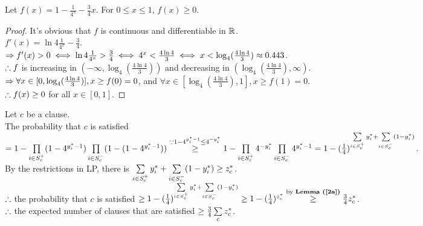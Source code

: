 \begin{pr}
\begin{lm}
\label{2a}
Let $f(x)=1-\frac1{4^x}-\frac34x$. For $0\leq x\leq1$, $f(x)\geq0$.
\begin{proof}
It's obvious that $f$ is continuous and differentiable in $\mathbb{R}$.\\
$f'(x)=\ln4\frac1{4^x}-\frac34$.\\
$\Rightarrow f'(x)>0\iff\ln4\frac1{4^x}>\frac34\iff4^x<\frac{4\ln4}3\iff x<\log_4(\frac{4\ln4}3)\approx0.443$.\\
$\therefore f$ is increasing in $(-\infty, \log_4(\frac{4\ln4}3))$ and decreasing in $(\log_4(\frac{4\ln4}3), \infty)$.\\
$\Rightarrow\forall x\in[0, \log_4(\frac{4\ln4}3)], x\geq f(0)=0$, and $\forall x\in[\log_4(\frac{4\ln4}3), 1], x\geq f(1)=0$.\\
$\therefore f(x)\geq0$ for all $x\in[0, 1]$.
\end{proof}
\end{lm}
\newcommand{\scp}{{S_c^+}}
\newcommand{\scn}{{S_c^-}}
\newcommand{\yi}{{y_i^*}}
\newcommand{\zc}{{z_c^*}}
Let $c$ be a clause.\\
The probability that $c$ is satisfied $=1-\prodl_{i\in\scp}(1-4^{\yi-1})\prodl_{i\in\scn}(1-(1-4^{\yi-1}))\overset{\cuz1-4^{\yi-1}\leq4^{-\yi}}\geq1-\prodl_{i\in\scp}4^{-\yi}\prodl_{i\in\scn}4^{\yi-1}=1-(\frac14)^{\suml_{i\in\scp}\yi+\suml_{i\in\scn}(1-\yi)}$.\\
By the restrictions in LP, there is $\suml_{i\in\scp}\yi+\suml_{i\in\scn}(1-\yi)\geq\zc$.\\
$\therefore$ the probability that $c$ is satisfied $\geq1-(\frac14)^{\suml_{i\in\scp}\yi+\suml_{i\in\scn}(1-\yi)}\geq1-(\frac14)^\zc\overtext{by \rflm{2a}}\geq\frac34\zc$.\\
$\therefore$ the expected number of clauses that are satisfied $\geq\frac34\suml_c\zc$.
\end{pr}
